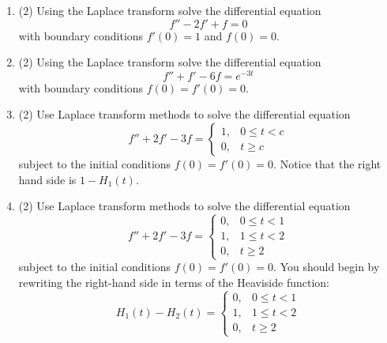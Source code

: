 \documentclass[12pt]{article}
\begin{document}
\begin{enumerate}

\item (2)
Using the Laplace transform solve the differential equation
\begin{equation}
f''-2f'+f=0
\end{equation}
with boundary conditions $f'(0)=1$ and $f(0)=0$.

\item (2)
Using the Laplace transform solve the differential equation
\begin{equation}
f''+f'-6f=e^{-3t}
\end{equation}
with boundary conditions $f(0)=f'(0)=0$.


\item (2) Use Laplace transform methods to solve the differential equation
\begin{equation}
f'' + 2 f' - 3 f =
\left\{ \begin{array}{ll}
1, & 0 \leq t < c\\
0, & t \geq c
\end{array}\right.
\end{equation}
subject to the initial conditions $f(0) =f'(0) = 0$. Notice that the right hand side is $1-H_1(t)$.
\vskip 1cm

\item (2) Use Laplace transform methods to solve the differential equation
\begin{equation}
f'' + 2 f' - 3 f =
\left\{ \begin{array}{ll}
0, & 0 \le t < 1\\
1, & 1\le t < 2\\
0, & t\ge 2
\end{array}\right.
\end{equation}
subject to the initial conditions $f(0) =f'(0) = 0$. You should begin by rewriting the right-hand side in terms of the Heaviside function:
\begin{equation}
H_1(t)-H_2(t)=
\left\{ \begin{array}{ll}
0, & 0 \le t < 1\\
1, & 1\le t < 2\\
0, & t\ge 2
\end{array}\right.
\end{equation}
\end{enumerate}

\vfill

\noindent
\end{document}
